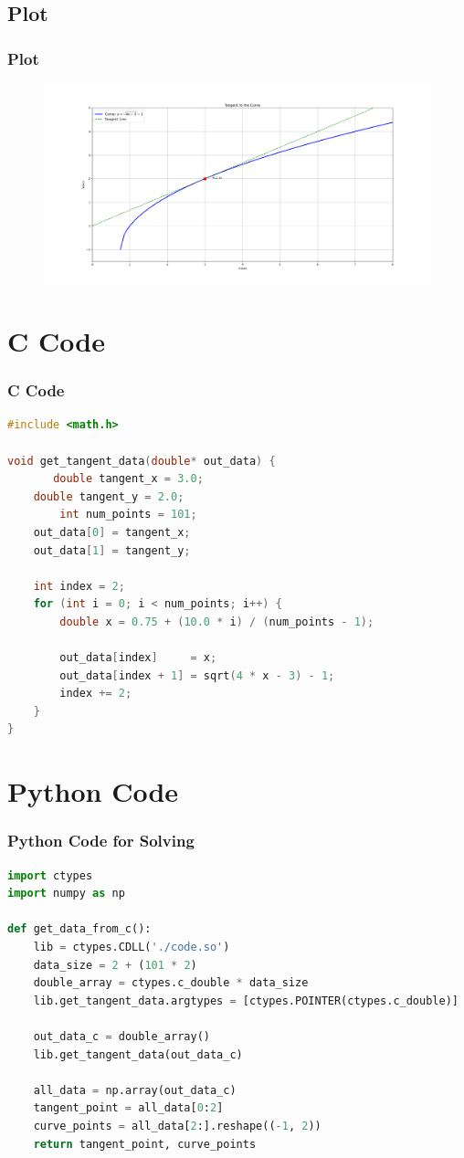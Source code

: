 \documentclass{beamer}
\theoremstyle{remark}
\numberwithin{equation}{section}
\begin{document}
\subsection{Plot}
\begin{frame}[fragile]
\frametitle{Plot}

\begin{figure}[h!]
   \centering
   \includegraphics[width=0.7\columnwidth]{figs/fig1.png}
	\caption{}
   \label{}
\end{figure}
\end{frame}

\section{C Code}
\begin{frame}[fragile]
\frametitle{C Code}
\begin{lstlisting}[language=C]
#include <math.h>

void get_tangent_data(double* out_data) {
       double tangent_x = 3.0;
    double tangent_y = 2.0;
        int num_points = 101;
    out_data[0] = tangent_x;
    out_data[1] = tangent_y;

    int index = 2;
    for (int i = 0; i < num_points; i++) {
        double x = 0.75 + (10.0 * i) / (num_points - 1);

        out_data[index]     = x;
        out_data[index + 1] = sqrt(4 * x - 3) - 1;
        index += 2;
    }
}


    \end{lstlisting}
\end{frame}

\section{Python Code}
\begin{frame}[fragile]
\frametitle{Python Code for Solving}
\begin{lstlisting}[language=Python]
import ctypes
import numpy as np

def get_data_from_c():
    lib = ctypes.CDLL('./code.so')
    data_size = 2 + (101 * 2)
    double_array = ctypes.c_double * data_size
    lib.get_tangent_data.argtypes = [ctypes.POINTER(ctypes.c_double)]

    out_data_c = double_array()
    lib.get_tangent_data(out_data_c)

    all_data = np.array(out_data_c)
    tangent_point = all_data[0:2]
    curve_points = all_data[2:].reshape((-1, 2))
    return tangent_point, curve_points



\end{lstlisting}
\end{frame}
 
\end{document}
